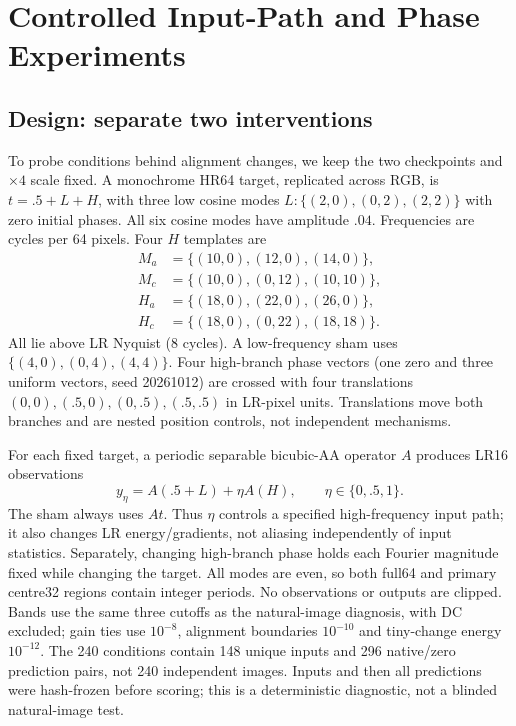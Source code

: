 \section{Controlled Input-Path and Phase Experiments}
\label{sec:controlled}
\subsection{Design: separate two interventions}
To probe conditions behind alignment changes, we keep the two checkpoints
and $\times4$ scale fixed. A monochrome HR64 target, replicated across
RGB, is $t=.5+L+H$, with three low cosine modes
$L:\{(2,0),(0,2),(2,2)\}$ with zero initial phases. All six cosine modes
have amplitude $.04$. Frequencies are
cycles per 64 pixels. Four $H$ templates are
\begin{align*}
 M_a&=\{(10,0),(12,0),(14,0)\},\\
 M_c&=\{(10,0),(0,12),(10,10)\},\\
 H_a&=\{(18,0),(22,0),(26,0)\},\\
 H_c&=\{(18,0),(0,22),(18,18)\}.
\end{align*}
All lie above LR Nyquist (8 cycles). A low-frequency sham uses
$\{(4,0),(0,4),(4,4)\}$. Four high-branch phase vectors (one zero and
three uniform vectors, seed 20261012) are crossed with four translations
$(0,0),(.5,0),(0,.5),(.5,.5)$ in LR-pixel units. Translations move both
branches and are nested position controls, not independent mechanisms.

For each fixed target, a periodic separable bicubic-AA operator $A$
produces LR16 observations
\begin{equation}
 y_\eta=A(.5+L)+\eta A(H),\qquad \eta\in\{0,.5,1\}.
 \label{eq:path}
\end{equation}
The sham always uses $At$. Thus $\eta$ controls a specified high-frequency
input path; it also changes LR energy/gradients, not aliasing independently
of input statistics. Separately, changing high-branch phase holds each
Fourier magnitude fixed while changing the target. All modes are even,
so both full64 and primary centre32 regions contain integer periods.
No observations or outputs are clipped. Bands use the same three cutoffs
as the natural-image diagnosis, with DC excluded; gain ties use
$10^{-8}$, alignment boundaries $10^{-10}$ and tiny-change energy $10^{-12}$.
The 240 conditions contain 148
unique inputs and 296 native/zero prediction pairs, not 240 independent
images. Inputs and then all predictions were hash-frozen before scoring;
this is a deterministic diagnostic, not a blinded natural-image test.



